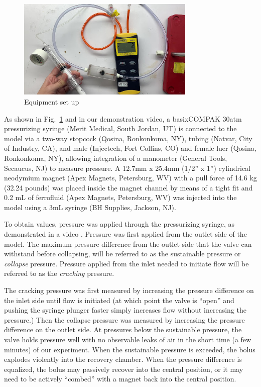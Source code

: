 \documentclass[]{asme2ej}
\begin{document}
\begin{figure}
\centerline{\includegraphics[width=3.34in]{figure/Figure2.jpeg}}
\caption{Equipment set up}
\label{fig_equipment}
\end{figure}

As shown in Fig.~\ref{fig_equipment} and in our demonstration video\cite{stuckey2021video},
a basixCOMPAK 30atm pressurizing syringe (Merit Medical, South Jordan,
UT) is connected to the model via a two-way stopcock (Qosina,
Ronkonkoma, NY), tubing (Natvar, City of Industry, CA), and male
(Injectech, Fort Collins, CO) and female luer (Qosina, Ronkonkoma,
NY), allowing integration of a manometer (General Tools, Secaucus, NJ)
to measure pressure. A 12.7mm x 25.4mm (1/2” x 1”)
cylindrical neodymium magnet (Apex
Magnets, Petersburg, WV) with a pull force of 14.6 kg (32.24 pounds)
was placed inside the magnet channel by means
of a tight fit and 0.2 mL of ferrofluid (Apex Magnets, Petersburg, WV)
was injected into the model using a 3mL syringe (BH Supplies, Jackson,
NJ).

To obtain values, pressure was applied through the pressurizing
syringe, as demonstrated in a video \cite{stuckey2021video}.
Pressure was first applied from the outlet side of the model.
The maximum pressure difference from the outlet side that the
valve can withstand before collapsing, will be referred to as the
sustainable pressure or {\em collapse} pressure.
Pressure applied from the inlet needed to
initiate flow will be referred to as the {\em cracking} pressure.

The cracking pressure was first measured by increasing the pressure
difference on the inlet side until flow is initiated (at which point
the valve is ``open'' and
pushing the syringe plunger faster simply increases flow without
increasing the pressure.) Then the
collapse pressure was measured by increasing the pressure
difference on the outlet side. At pressures below the sustainable
pressure, the valve holds pressure well with no observable leaks of
air in the short time (a few minutes) of our experiment. When the
sustainable pressure is exceeded, the bolus explodes violently into
the recovery chamber. When the pressure difference is equalized, the
bolus may passively recover into the central position, or it may need
to be actively “combed” with a magnet back into the central position.
\end{document}
